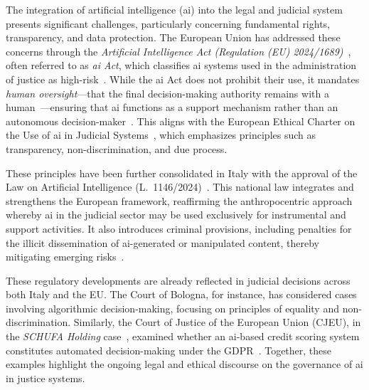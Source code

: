 The integration of artificial intelligence (\ac{ai}) into the legal and judicial
system presents significant challenges, particularly concerning fundamental
rights, transparency, and data protection. The European Union has addressed
these concerns through the \emph{Artificial Intelligence Act (Regulation (EU)
2024/1689)}~\cite{ai_act}, often referred to as \emph{\acs{ai} Act}, which classifies \ac{ai} systems used in the
administration of justice as high-risk~\cite[Annex~III]{ai_act}. While the
\ac{ai} Act does not prohibit their use, it mandates \emph{human
oversight}---\ie that the final decision-making authority remains with a
human~\cite[Art.~14]{ai_act}---ensuring that \ac{ai} functions as a support
mechanism rather than an autonomous decision-maker~\cite{juliahb2024}. This
aligns with the European Ethical Charter on the Use of \ac{ai} in Judicial
Systems~\cite{ethicalcharter2018}, which emphasizes principles such as
transparency, non-discrimination, and due process.

These principles have been further consolidated in Italy with the approval of the Law on Artificial Intelligence (L.~1146/2024)~\cite{leggeia2025}. This national law integrates and strengthens the European framework, reaffirming the anthropocentric approach whereby \ac{ai} in the judicial sector may be used exclusively for instrumental and support activities. It also introduces criminal provisions, including penalties for the illicit dissemination of \ac{ai}-generated or manipulated content, thereby mitigating emerging risks~\cite{reuters_italy_ai_law_2025}.

These regulatory developments are already reflected in judicial decisions across both Italy and the EU. The Court of Bologna, for instance, has considered cases involving algorithmic decision-making, focusing on principles of equality and non-discrimination. Similarly, the Court of Justice of the European Union (CJEU), in the \emph{SCHUFA Holding} case~\cite{schufaholding2023}, examined whether an \ac{ai}-based credit scoring system constitutes automated decision-making under the GDPR~\cite{gdpr2016}.
Together, these examples highlight the ongoing legal and ethical discourse on the governance of \ac{ai} in justice systems.


